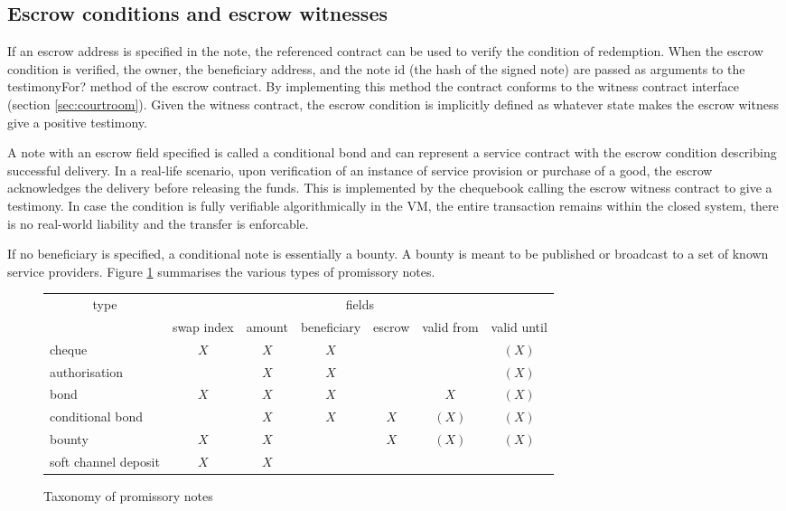 \documentclass[a4paper,10pt]{article}
\begin{document}
\subsection{Escrow conditions and escrow witnesses}

If an escrow address is specified in the note, the referenced contract can be used to verify the condition
of redemption. When the escrow condition is verified, the owner, the beneficiary address, and
the note id (the hash of the signed note) are passed as arguments to the {\gls{testimonyFor?}} method
of the escrow contract. By implementing this method the contract conforms to the \gls{witness} contract
 interface
(section \ref{sec:courtroom}). Given the witness contract, the escrow condition is implicitly defined
as whatever state makes the escrow witness give a positive testimony.

A note with an escrow field specified is called a \gls{conditional bond} and
can represent a \gls{service contract} with the escrow condition describing successful delivery.
In a real-life scenario, upon verification of an instance of service provision or purchase of a good,
the escrow acknowledges the delivery before releasing the funds.
This is implemented by the chequebook calling the escrow witness contract
to give a testimony. In case the condition is fully verifiable algorithmically in the VM,
the entire transaction remains within the closed system, there is no real-world liability and the transfer
is enforcable.

If no beneficiary is specified, a conditional note is essentially a \gls{bounty}.
A bounty is meant to be published or broadcast to a set of known service providers.
Figure \ref{fig:taxonomy} summarises the various types of promissory notes.


\newcommand{\tick}{$X$}
\newcommand{\opt}{$(X)$}
\begin{center}
\begin{figure}
\begin{center}
\begin{tabular}{|l||c|c|c|c|c|c|}
\hline
\multicolumn{1}{|c||}{type}
& \multicolumn{6}{c|}{fields}
\\
\cline{2-7}
& swap index
& amount
& beneficiary
& escrow
& valid from
& valid until
\\
\hline
\hline
cheque & \tick & \tick & \tick & & & \opt
\\
authorisation &  & \tick & \tick & & & \opt
\\
bond & \tick & \tick & \tick & & \tick & \opt
\\
conditional bond &  & \tick & \tick & \tick & \opt & \opt
\\
bounty & \tick &  \tick & & \tick & \opt & \opt
\\
soft channel deposit &  \tick & \tick & & & &
\\
\hline
\end{tabular}
\end{center}
\caption{Taxonomy of promissory notes}
\label{fig:taxonomy}
\end{figure}
\end{center}
\end{document}

